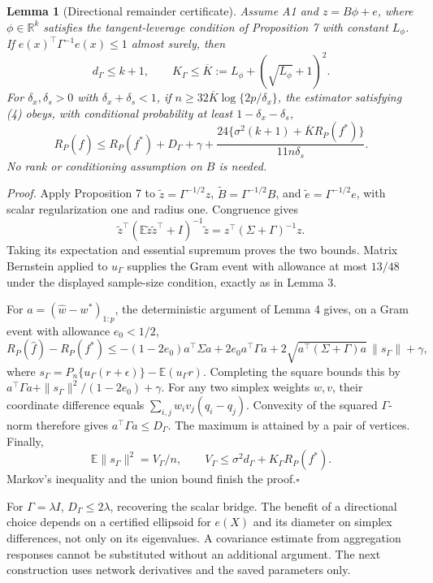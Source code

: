 \documentclass[pdflatex,sn-mathphys-ay]{sn-jnl}
\newtheorem{pathlemma}{Lemma}\renewcommand{\thepathlemma}{S\arabic{pathlemma}}
\theoremstyle{remark}\newtheorem{remark}[theorem]{Remark}
\newcommand{\E}{\mathbb E}
\newcommand{\R}{\mathbb R}
\begin{document}
\begin{pathlemma}[Directional remainder certificate]\label{lem:matrixallowance}
Assume A1 and $z=B\phi+e$, where $\phi\in\R^k$ satisfies the tangent-leverage condition of Proposition 7 with constant $L_\phi$. If $e(x)^\top\Gamma^{-1}e(x)\leq1$ almost surely, then
\[
 d_\Gamma\leq k+1,\qquad K_\Gamma\leq\overline K:=L_\phi+(\sqrt{L_\phi}+1)^2.
\]
For $\delta_x,\delta_s>0$ with $\delta_x+\delta_s<1$, if
$n\geq32\overline K\log\{2p/\delta_x\}$, the estimator satisfying (4) obeys, with conditional probability at least $1-\delta_x-\delta_s$,
\begin{equation}\label{eq:matrixallowance}
 R_P(\hat f)\leq R_P(f^*)+D_\Gamma+\gamma+
 \frac{24\{\sigma^2(k+1)+\overline K R_P(f^*)\}}{11n\delta_s}.
\end{equation}
No rank or conditioning assumption on $B$ is needed.
\end{pathlemma}
\noindent\textit{Proof.}
Apply Proposition 7 to $\widetilde z=\Gamma^{-1/2}z$, $\widetilde B=\Gamma^{-1/2}B$, and $\widetilde e=\Gamma^{-1/2}e$, with scalar regularization one and radius one. Congruence gives
\[
 \widetilde z^\top(\E\widetilde z\widetilde z^\top+I)^{-1}\widetilde z
 =z^\top(\Sigma+\Gamma)^{-1}z.
\]
Taking its expectation and essential supremum proves the two bounds. Matrix Bernstein applied to $u_\Gamma$ supplies the Gram event with allowance at most $13/48$ under the displayed sample-size condition, exactly as in Lemma 3.

For $a=(\hat w-w^*)_{1:p}$, the deterministic argument of Lemma 4 gives, on a Gram event with allowance $e_0<1/2$,
\[
 R_P(\hat f)-R_P(f^*)
 \leq -(1-2e_0)a^\top\Sigma a+2e_0a^\top\Gamma a
       +2\sqrt{a^\top(\Sigma+\Gamma)a}\,\|s_\Gamma\|+\gamma,
\]
where $s_\Gamma=P_n\{u_\Gamma(r+\epsilon)\}-\E(u_\Gamma r)$. Completing the square bounds this by
$a^\top\Gamma a+\|s_\Gamma\|^2/(1-2e_0)+\gamma$.
For any two simplex weights $w,v$, their coordinate difference equals
$\sum_{i,j}w_i v_j(q_i-q_j)$. Convexity of the squared $\Gamma$-norm therefore gives $a^\top\Gamma a\leq D_\Gamma$. The maximum is attained by a pair of vertices. Finally,
\[
 \E\|s_\Gamma\|^2=V_\Gamma/n,
 \qquad V_\Gamma\leq\sigma^2d_\Gamma+K_\Gamma R_P(f^*).
\]
Markov's inequality and the union bound finish the proof.\hfill$\square$

For $\Gamma=\lambda I$, $D_\Gamma\leq2\lambda$, recovering the scalar bridge. The benefit of a directional choice depends on a certified ellipsoid for $e(X)$ and its diameter on simplex differences, not only on its eigenvalues. A covariance estimate from aggregation responses cannot be substituted without an additional argument. The next construction uses network derivatives and the saved parameters only.
\end{document}
